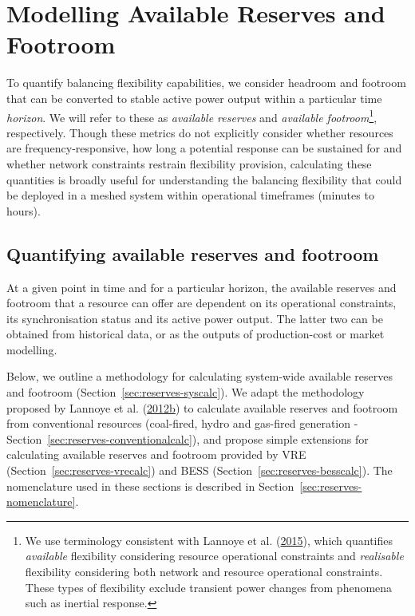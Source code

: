 \documentclass[12pt,a4paper,]{report}
\begin{document}
\hypertarget{sec:reserves-modeloverview}{%
\section{Modelling Available Reserves and
Footroom}\label{sec:reserves-modeloverview}}

To quantify balancing flexibility capabilities, we consider headroom and
footroom that can be converted to stable active power output within a
particular time \emph{horizon}. We will refer to these as
\emph{available reserves} and \emph{available footroom}\footnote{We use
  terminology consistent with Lannoye et al.
  (\protect\hyperlink{ref-lannoyeTransmissionVariableGeneration2015}{2015}),
  which quantifies \emph{available} flexibility considering resource
  operational constraints and \emph{realisable} flexibility considering
  both network and resource operational constraints. These types of
  flexibility exclude transient power changes from phenomena such as
  inertial response.}, respectively. Though these metrics do not
explicitly consider whether resources are frequency-responsive, how long
a potential response can be sustained for and whether network
constraints restrain flexibility provision, calculating these quantities
is broadly useful for understanding the balancing flexibility that could
be deployed in a meshed system within operational timeframes (minutes to
hours).

\hypertarget{quantifying-available-reserves-and-footroom}{%
\subsection{Quantifying available reserves and
footroom}\label{quantifying-available-reserves-and-footroom}}

At a given point in time and for a particular horizon, the available
reserves and footroom that a resource can offer are dependent on its
operational constraints, its synchronisation status and its active power
output. The latter two can be obtained from historical data, or as the
outputs of production-cost or market modelling.

Below, we outline a methodology for calculating system-wide available
reserves and footroom (Section~\ref{sec:reserves-syscalc}). We adapt the
methodology proposed by Lannoye et al.
(\protect\hyperlink{ref-lannoyeEvaluationPowerSystem2012}{2012b}) to
calculate available reserves and footroom from conventional resources
(coal-fired, hydro and gas-fired generation -
Section~\ref{sec:reserves-conventionalcalc}), and propose simple
extensions for calculating available reserves and footroom provided by
VRE (Section~\ref{sec:reserves-vrecalc}) and BESS
(Section~\ref{sec:reserves-besscalc}). The nomenclature used in these
sections is described in Section~\ref{sec:reserves-nomenclature}.
\end{document}
